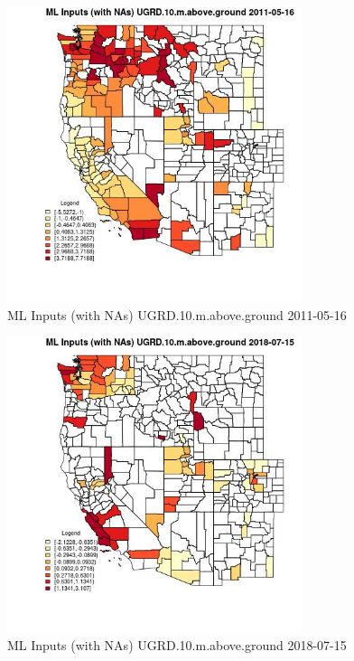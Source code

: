 \begin{figure} 
\centering  
\includegraphics[width=0.77\textwidth]{Code_Outputs/Report_ML_input_PM25_Step4_part_e_de_duplicated_aves_compiled_2019-05-21wNAs_CountyUGRD10mabovegroundMean2011-05-16.jpg} 
\caption{\label{fig:Report_ML_input_PM25_Step4_part_e_de_duplicated_aves_compiled_2019-05-21wNAsCountyUGRD10mabovegroundMean2011-05-16}ML Inputs (with NAs) UGRD.10.m.above.ground 2011-05-16} 
\end{figure} 
 

\begin{figure} 
\centering  
\includegraphics[width=0.77\textwidth]{Code_Outputs/Report_ML_input_PM25_Step4_part_e_de_duplicated_aves_compiled_2019-05-21wNAs_CountyUGRD10mabovegroundMean2018-07-15.jpg} 
\caption{\label{fig:Report_ML_input_PM25_Step4_part_e_de_duplicated_aves_compiled_2019-05-21wNAsCountyUGRD10mabovegroundMean2018-07-15}ML Inputs (with NAs) UGRD.10.m.above.ground 2018-07-15} 
\end{figure} 
 


